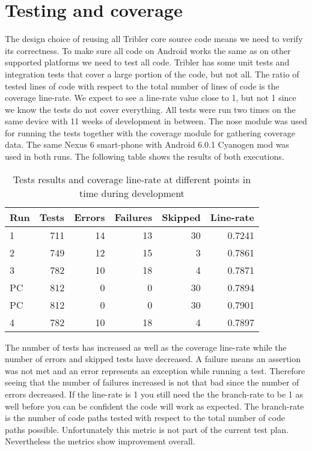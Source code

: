 \section{Testing and coverage}
The design choice of reusing all Tribler core source code means we need to verify its correctness.
To make sure all code on Android works the same as on other supported platforms we need to test all code.
Tribler has some unit tests and integration tests that cover a large portion of the code, but not all.
The ratio of tested lines of code with respect to the total number of lines of code is the coverage line-rate.
We expect to see a line-rate value close to 1, but not 1 since we know the tests do not cover everything.
All tests were run two times on the same device with 11 weeks of development in between.
The nose module was used for running the tests together with the coverage module for gathering coverage data.
The same Nexus 6 smart-phone with Android 6.0.1 Cyanogen mod was used in both runs.
The following table shows the results of both executions.
\begin{table}
	\begin{tabular}{l | *{5}{r}} \hline
		Run & Tests & Errors & Failures & Skipped & Line-rate \\ \hline \hline
		1     & 711   & 14       & 13          & 30          & 0.7241 \\ \hline
		2     & 749   & 12       & 15          & 3            & 0.7861 \\ \hline
		3	  & 782	  & 10		 & 18		   & 4			  & 0.7871 \\ \hline
		PC   & 812   & 0         & 0            & 30          & 0.7894 \\ \hline
		PC   & 812   & 0         & 0            & 30          & 0.7901 \\ \hline
		4     & 782   & 10       & 18          & 4            & 0.7897 \\ \hline
	\end{tabular}
	\caption{Tests results and coverage line-rate at different points in time during development}
	\label{table:testing_coverage}
\end{table}

The number of tests has increased as well as the coverage line-rate while the number of errors and skipped tests have decreased.
A failure means an assertion was not met and an error represents an exception while running a test.
Therefore seeing that the number of failures increased is not that bad since the number of errors decreased.
If the line-rate is 1 you still need the the branch-rate to be 1 as well before you can be confident the code will work as expected.
The branch-rate is the number of code paths tested with respect to the total number of code paths possible.
Unfortunately this metric is not part of the current test plan.
Nevertheless the metrics show improvement overall.

